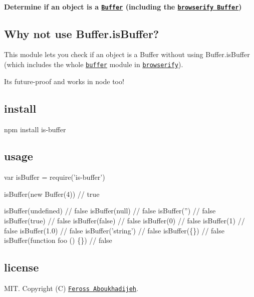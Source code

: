 \paragraph*{Determine if an object is a \href{http://nodejs.org/api/buffer.html}{\tt {\ttfamily Buffer}} (including the \href{https://github.com/feross/buffer}{\tt browserify Buffer})}

\href{https://saucelabs.com/u/is-buffer}{\tt }

\subsection*{Why not use {\ttfamily Buffer.\+is\+Buffer}?}

This module lets you check if an object is a {\ttfamily Buffer} without using {\ttfamily Buffer.\+is\+Buffer} (which includes the whole \href{https://github.com/feross/buffer}{\tt buffer} module in \href{http://browserify.org/}{\tt browserify}).

It\textquotesingle{}s future-\/proof and works in node too!

\subsection*{install}


\begin{DoxyCode}
npm install is-buffer
\end{DoxyCode}


\subsection*{usage}


\begin{DoxyCode}
var isBuffer = require('is-buffer')

isBuffer(new Buffer(4)) // true

isBuffer(undefined) // false
isBuffer(null) // false
isBuffer('') // false
isBuffer(true) // false
isBuffer(false) // false
isBuffer(0) // false
isBuffer(1) // false
isBuffer(1.0) // false
isBuffer('string') // false
isBuffer(\{\}) // false
isBuffer(function foo () \{\}) // false
\end{DoxyCode}


\subsection*{license}

M\+IT. Copyright (C) \href{http://feross.org}{\tt Feross Aboukhadijeh}. 